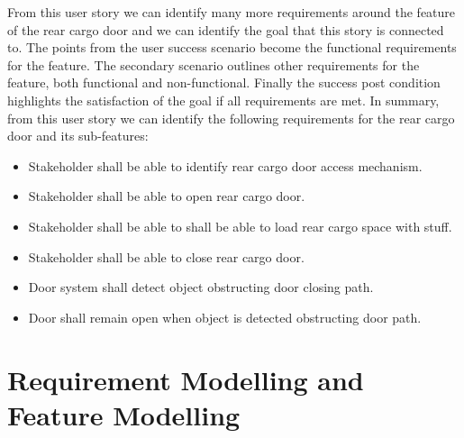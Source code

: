 From this user story we can identify many more requirements around the feature of the rear cargo door and we can identify the goal that this story is connected to. The points from the user success scenario become the functional requirements for the feature. The secondary scenario outlines other requirements for the feature, both functional and non-functional. Finally the success post condition highlights the satisfaction of the goal if all requirements are met. In summary, from this user story we can identify the following requirements for the rear cargo door and its sub-features:
\begin{itemize}
	\item Stakeholder shall be able to identify rear cargo door access mechanism.
	\item Stakeholder shall be able to open rear cargo door.
	\item Stakeholder shall be able to shall be able to load rear cargo space with stuff.
	\item Stakeholder shall be able to close rear cargo door.
	\item Door system shall detect object obstructing door closing path. 
	\item Door shall remain open when object is detected obstructing door path.
\end{itemize}

\section{Requirement Modelling and Feature Modelling}

